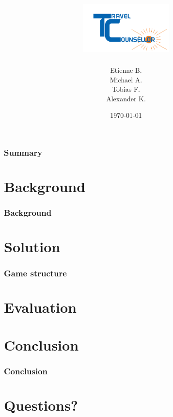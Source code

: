 \documentclass{beamer}
\title{\hspace{60px}\includegraphics[height=100px]{resources/logo.png}}
\institute{University of Innsbruck}
\date{\today}
\institute{Innsbruck University}
\author[Etienne Bertin]{Etienne B. \\ Michael A.\\ Tobias F.\\ Alexander K.}
\begin{document}
\begin{frame}
	\titlepage
\end{frame}


\begin{frame}
	\frametitle{Summary}
\end{frame}


\section{Background}
\begin{frame}
	\frametitle{Background}
\end{frame}

\section{Solution}

\begin{frame}
	\frametitle{Game structure}
\end{frame}

\section{Evaluation}
\begin{frame}
\end{frame}

\section{Conclusion}
\begin{frame}
	\frametitle{Conclusion}
\end{frame}


\section{Questions?}
\end{document}
